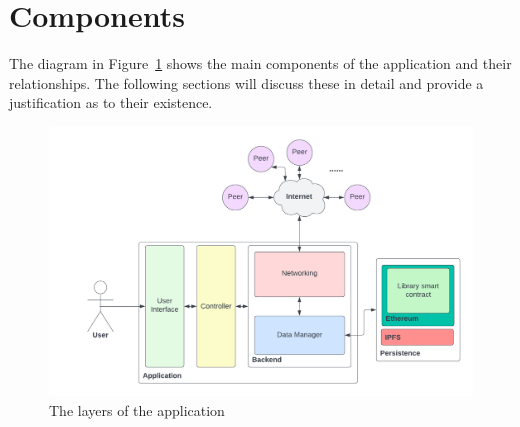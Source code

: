 
\section{Components}

The diagram in Figure~\ref{fig:impl-layers} shows the main components of the application and their relationships. The following sections will discuss these in detail and provide a justification as to their existence.

\begin{figure}[ht]
  \centering
  \includegraphics[width=.8\textwidth]{assets/images/diagrams/layers.png}
  \caption{The layers of the application}
  \label{fig:impl-layers}
\end{figure}





